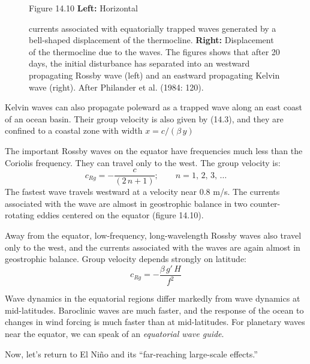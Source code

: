 \begin{figure}[t!]
\footnotesize
Figure 14.10 \textbf{Left:} Horizontal \rule{0pt}{4ex}currents
associated with equatorially trapped waves generated by a bell-shaped
displacement of the thermocline.
\textbf{Right:} Displacement of the
thermocline due to the waves. The
figures shows that after 20 days, the initial disturbance has
separated into an westward propagating Rossby wave
(left) and an eastward propagating Kelvin wave
(right). After Philander et al. (1984: 120).
\label{fig:rossbycurrents}
\vspace{-4ex}
\end{figure}

Kelvin waves can also propagate poleward as a trapped wave along an
east coast of an ocean basin. Their group velocity is also given by
(14.3), and they are confined to a coastal zone with width
$x=c/\left(\beta\,y\right)$

The important Rossby waves on the equator have
frequencies much less than the Coriolis frequency. They can travel
only to the west. The group velocity is:
\begin{equation}
c_{Rg} = - \frac{c}{\left(2\,n+1\right)}; \qquad n=1,\,2,\,3,\,\ldots
\end{equation}
The fastest wave travels westward at a velocity near 0.8 m/s. The
currents associated with the wave are almost in geostrophic
balance in two
counter-rotating eddies centered on the equator (figure 14.10).

Away from the equator, low-frequency, long-wavelength
Rossby waves also travel only to the west, and the
currents associated with the waves are again almost in geostrophic
balance. Group velocity depends strongly on latitude:
\begin{equation}
c_{Rg} = -\frac{\beta\,g'\,H}{f^2}
\end{equation}

Wave dynamics in the equatorial regions differ markedly from wave
dynamics at mid-latitudes. Baroclinic waves are much faster, and the
response of the ocean to changes in wind forcing is much faster than
at mid-latitudes. For planetary waves near the equator, we can speak
of an \textit{equatorial wave guide}.

Now, let's return to El Ni\~{n}o and its ``far-reaching large-scale
effects.''

